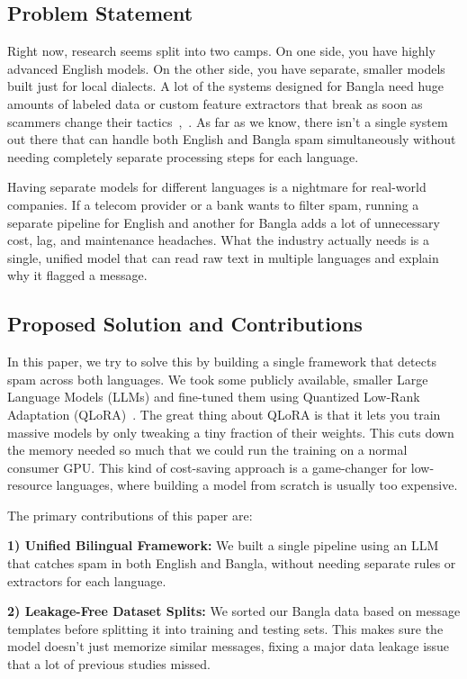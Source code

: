 \documentclass[journal]{IEEEtran}
\begin{document}
\subsection{Problem Statement}

Right now, research seems split into two camps. On one side, you have highly advanced English models. On the other side, you have separate, smaller models built just for local dialects. A lot of the systems designed for Bangla need huge amounts of labeled data or custom feature extractors that break as soon as scammers change their tactics~\cite{ref7},~\cite{ref10}. As far as we know, there isn't a single system out there that can handle both English and Bangla spam simultaneously without needing completely separate processing steps for each language.

Having separate models for different languages is a nightmare for real-world companies. If a telecom provider or a bank wants to filter spam, running a separate pipeline for English and another for Bangla adds a lot of unnecessary cost, lag, and maintenance headaches. What the industry actually needs is a single, unified model that can read raw text in multiple languages and explain why it flagged a message.

\subsection{Proposed Solution and Contributions}

In this paper, we try to solve this by building a single framework that detects spam across both languages. We took some publicly available, smaller Large Language Models (LLMs) and fine-tuned them using Quantized Low-Rank Adaptation (QLoRA)~\cite{ref11}. The great thing about QLoRA is that it lets you train massive models by only tweaking a tiny fraction of their weights. This cuts down the memory needed so much that we could run the training on a normal consumer GPU. This kind of cost-saving approach is a game-changer for low-resource languages, where building a model from scratch is usually too expensive.

The primary contributions of this paper are:

\textbf{1) Unified Bilingual Framework:} We built a single pipeline using an LLM that catches spam in both English and Bangla, without needing separate rules or extractors for each language.

\textbf{2) Leakage-Free Dataset Splits:} We sorted our Bangla data based on message templates before splitting it into training and testing sets. This makes sure the model doesn't just memorize similar messages, fixing a major data leakage issue that a lot of previous studies missed.
\end{document}
